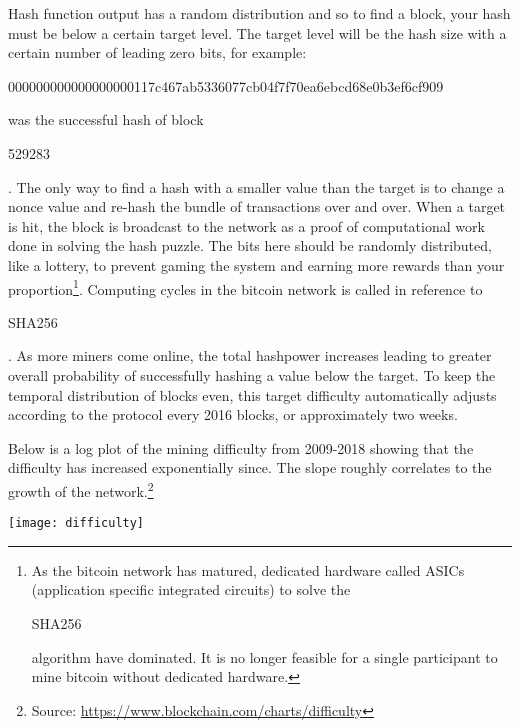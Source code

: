  Hash function output has a random distribution and so to find a block, your hash must be below a certain target level. The target level will be the hash size with a certain number of leading zero bits, for example:\begin{center}\begin{code}
	000000000000000000117c467ab5336077cb04f7f70ea6ebcd68e0b3ef6cf909
\end{code}\end{center} 
was the successful hash of block \begin{code}529283\end{code}. The only way to find a hash with a smaller value than the target is to change a nonce value and re-hash the bundle of transactions over and over. When a target is hit, the block is broadcast to the network as a proof of computational work done in solving the hash puzzle. 
The bits here should be randomly distributed, like a lottery, to prevent gaming the system and earning more rewards than your proportion\footnote{As the bitcoin network has matured, dedicated hardware called ASICs (application specific integrated circuits) to solve the \begin{code}SHA256\end{code} algorithm have dominated. It is no longer feasible for a single participant to mine bitcoin without dedicated hardware.}. Computing cycles in the bitcoin network is called  in reference to \begin{code}SHA256\end{code}. As more miners come online, the total hashpower increases leading to greater overall probability of successfully hashing a value below the target. To keep the temporal distribution of blocks even, this target difficulty automatically adjusts according to the protocol every 2016 blocks, or approximately two weeks.

Below is a log plot of the mining difficulty from 2009-2018 showing that the difficulty has increased exponentially since. The slope roughly correlates to the growth of the network.\footnote{Source: \url{https://www.blockchain.com/charts/difficulty}}

\begin{center}
	\texttt{[image: difficulty]}
\end{center}

